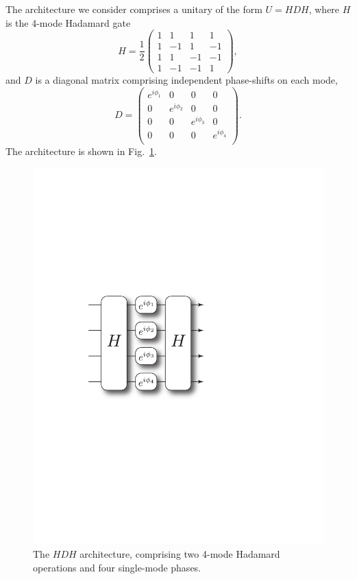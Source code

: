 \documentclass[aps,pra,twocolumn,amsmath,amssymb,nofootinbib,superscriptaddress]{revtex4}
\begin{document}
The architecture we consider comprises a unitary of the form $U = HDH$, where $H$ is the 4-mode Hadamard gate
\begin{equation}
H = \frac{1}{2} \left(\begin{array}{cccc}
1 & 1 & 1 & 1 \\
1 & -1 & 1 & -1 \\
1 & 1 & -1 & -1 \\
1 & -1 & -1 & 1
\end{array}\right),
\end{equation}
and $D$ is a diagonal matrix comprising independent phase-shifts on each mode,
\begin{equation}
D = \left(\begin{array}{cccc}
e^{i\phi_1} & 0 & 0 & 0 \\
0 & e^{i\phi_2} & 0 & 0 \\
0 & 0 & e^{i\phi_3} & 0 \\
0 & 0 & 0 & e^{i\phi_4} \\
\end{array}\right).
\end{equation}
The architecture is shown in Fig.~\ref{fig:HDH_decomposition}.
\begin{figure}[!htb]
\includegraphics[width=0.5\columnwidth]{HDH_decomposition}
\caption{The $HDH$ architecture, comprising two 4-mode Hadamard operations and four single-mode phases.} \label{fig:HDH_decomposition}
\end{figure}
\end{document}
